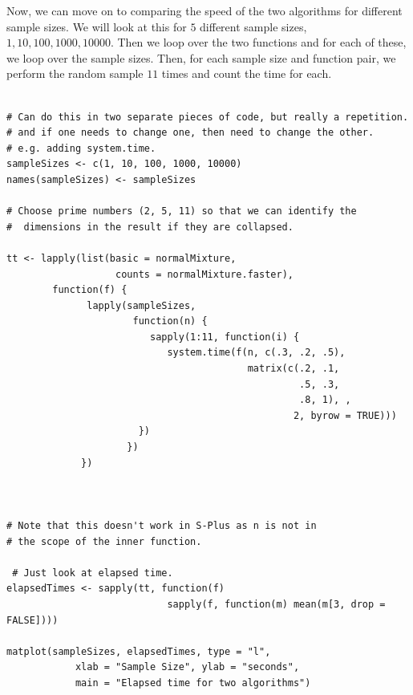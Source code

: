 \documentclass{article}
\begin{document}
\begin{description}
Now, we can move on to comparing the speed of the two algorithms for
different sample sizes.  We will look at this for $5$ different sample
sizes, $1, 10, 100, 1000, 10000$.  Then we loop over the two functions
and for each of these, we loop over the sample sizes.
Then, for each sample size and function pair, we perform the
random sample $11$ times and count the time for each.
\begin{verbatim}

# Can do this in two separate pieces of code, but really a repetition.
# and if one needs to change one, then need to change the other.
# e.g. adding system.time.
sampleSizes <- c(1, 10, 100, 1000, 10000)
names(sampleSizes) <- sampleSizes

# Choose prime numbers (2, 5, 11) so that we can identify the
#  dimensions in the result if they are collapsed.

tt <- lapply(list(basic = normalMixture,
                   counts = normalMixture.faster),
        function(f) {
              lapply(sampleSizes,
                      function(n) {
                         sapply(1:11, function(i) {
                            system.time(f(n, c(.3, .2, .5), 
                                          matrix(c(.2, .1, 
                                                   .5, .3, 
                                                   .8, 1), ,
                                                  2, byrow = TRUE)))
                       })
                     })
             })



# Note that this doesn't work in S-Plus as n is not in 
# the scope of the inner function.

 # Just look at elapsed time.
elapsedTimes <- sapply(tt, function(f)  
                            sapply(f, function(m) mean(m[3, drop = FALSE])))

matplot(sampleSizes, elapsedTimes, type = "l",
            xlab = "Sample Size", ylab = "seconds", 
            main = "Elapsed time for two algorithms")


\end{verbatim}
\end{description}
\end{document}
